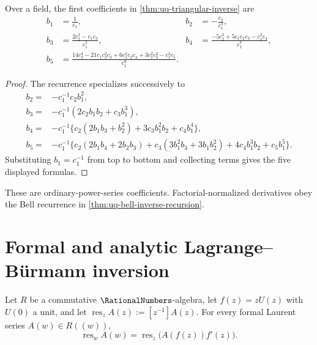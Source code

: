 \begin{corollary}
\label{cor:uq-first-inverse-coefficients}
Over a field, the first coefficients in
\cref{thm:uq-triangular-inverse} are
\[
\begin{aligned}
 b_1&=\frac1{c_1},&
 b_2&=-\frac{c_2}{c_1^3},\\
 b_3&=\frac{2c_2^2-c_1c_3}{c_1^5},&
 b_4&=\frac{-5c_2^3+5c_1c_2c_3-c_1^2c_4}{c_1^7},\\
 b_5&=\frac{14c_2^4-21c_1c_2^2c_3
       +6c_1^2c_2c_4+3c_1^2c_3^2-c_1^3c_5}{c_1^9}.
\end{aligned}
\]
\end{corollary}

\begin{proof}
The recurrence specializes successively to
\[
\begin{aligned}
b_2={}&-c_1^{-1}c_2b_1^2,\\
b_3={}&-c_1^{-1}(2c_2b_1b_2+c_3b_1^3),\\
b_4={}&-c_1^{-1}\{c_2(2b_1b_3+b_2^2)
                    +3c_3b_1^2b_2+c_4b_1^4\},\\
b_5={}&-c_1^{-1}\{c_2(2b_1b_4+2b_2b_3)
 +c_3(3b_1^2b_3+3b_1b_2^2)+4c_4b_1^3b_2+c_5b_1^5\}.
\end{aligned}
\]
Substituting \(b_1=c_1^{-1}\) from top to bottom and collecting terms gives
the five displayed formulas.
\end{proof}

\begin{remark}
These are ordinary-power-series coefficients.  Factorial-normalized
derivatives obey the Bell recurrence in
\cref{thm:uq-bell-inverse-recursion}.
\end{remark}

\section{Formal and analytic Lagrange--B\"urmann inversion}
\label{sec:uq-lagrange-burmann}

\begin{lemma}
\label{lem:uq-formal-residue-substitution}
Let \(R\) be a commutative \(\RationalNumbers\)-algebra, let
\(f(z)=zU(z)\) with \(U(0)\) a unit, and let
\(\operatorname{res}_z A(z):=[z^{-1}]A(z)\).  For every formal Laurent
series \(A(w)\in R((w))\),
\[
 \operatorname{res}_w A(w)
 =
 \operatorname{res}_z\!\bigl(A(f(z))f'(z)\bigr).
\]
\end{lemma}

